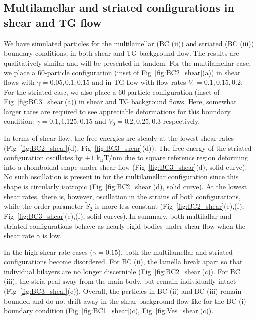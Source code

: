 \documentclass[prb,preprint,showpacs,preprintnumbers,amsmath,amssymb,longbibliography]{revtex4-1}
\begin{document}
\subsection{Multilamellar and striated configurations in shear and TG flow}
We have simulated particles for the multilamellar (BC (ii)) and striated (BC (iii))
boundary conditions, in both shear and TG background flow.  The results are
qualitatively similar and will be presented in tandem. 
For the multilamellar case, we place a 60-particle configuration (inset of Fig~\ref{fig:BC2_shear}(a))
in shear flows with $\dot\gamma=0.05, 0.1, 0.15$ and in TG flow with flow rates $V_0=0.1, 0.15, 0.2$.
For the striated case, we also place a 60-particle configuration (inset of Fig~\ref{fig:BC3_shear}(a))
in shear and TG background flows.  Here, somewhat larger rates are required to see appreciable
deformations for this boundary condition: $\dot\gamma=0.1, 0.125, 0.15$
and $V_0=0.2, 0.25, 0.3$ respectively.  

In terms of shear flow, the free energies are steady at the lowest shear 
rates (Fig~\ref{fig:BC2_shear}(d), Fig~\ref{fig:BC3_shear}(d)).
The free energy of the striated configuration oscillates by $\pm 1$ $\mathrm{k_BT}$/nm
due to square reference region deforming into a rhomboidal shape under shear
flow (Fig~\ref{fig:BC3_shear}(d), solid curve).  No such oscillation
is present in for the multilamellar configuration since this shape is circularly
isotropic (Fig~\ref{fig:BC2_shear}(d), solid curve).
At the lowest shear rates, there is, however, oscillation in the strains
of both configurations, 
while the order parameter $\tilde S_2$ is more less constant
(Fig~\ref{fig:BC2_shear}(e),(f), Fig~\ref{fig:BC3_shear}(e),(f), solid curves).
In summary, both multilallar and striated configurations behave as nearly
rigid bodies under shear flow when the shear rate $\dot \gamma$ is low.

In the high shear rate cases ($\dot\gamma=0.15$), both the
multilamellar and striated configurations become disordered.  For BC (ii),
the lamella break apart so that individual bilayers are no longer discernible
(Fig~\ref{fig:BC2_shear}(c)).
For BC (iii), the stria peal away from the main body,
but remain individually intact (Fig~\ref{fig:BC3_shear}(c)).  
Overall, the particles in BC (ii) and BC (iii) remain bounded
and do not drift away in the shear background flow like for the
BC (i) boundary condition (Fig~\ref{fig:BC1_shear}(c),
Fig~\ref{fig:Ves_shear}(c)).
\end{document}
